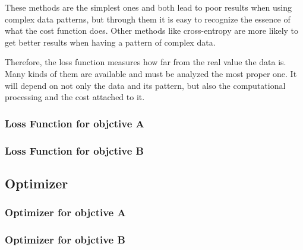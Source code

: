 These methods are the simplest ones and both lead to poor results when using complex data patterns, but through them it is easy to recognize the essence of what the cost function does. Other methods like cross-entropy are more likely to get better results when having a pattern of complex data.

Therefore, the loss function measures how far from the real value the data is. Many kinds of them are available and must be analyzed the most proper one. It will depend on not only the data and its pattern, but also the computational processing and the cost attached to it.


\subsubsection*{Loss Function for objctive A}
\subsubsection*{Loss Function for objctive B}

\subsection{Optimizer}

\subsubsection*{Optimizer for objctive A}
\subsubsection*{Optimizer for objctive B}





